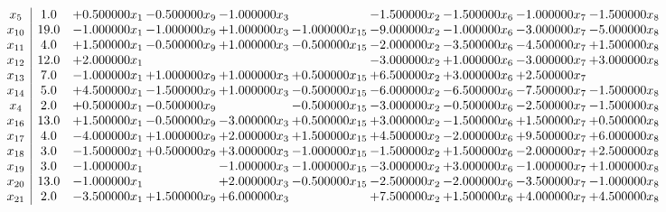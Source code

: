 \documentclass[10pt]{article}
\begin{document}
 \[\begin{array}{c| c c@{\hskip 2pt} c@{\hskip 2pt} c@{\hskip 2pt} c@{\hskip 2pt} c@{\hskip 2pt} c@{\hskip 2pt} c@{\hskip 2pt} c@{\hskip 2pt} }
 x_{5}   &  1.0 & + 0.500000 x_{1} & -0.500000 x_{9} & -1.000000 x_{3} &   & -1.500000 x_{2} & -1.500000 x_{6} & -1.000000 x_{7} & -1.500000 x_{8}\\
 x_{10}   &  19.0 & -1.000000 x_{1} & -1.000000 x_{9} & + 1.000000 x_{3} & -1.000000 x_{15} & -9.000000 x_{2} & -1.000000 x_{6} & -3.000000 x_{7} & -5.000000 x_{8}\\
 x_{11}   &  4.0 & + 1.500000 x_{1} & -0.500000 x_{9} & + 1.000000 x_{3} & -0.500000 x_{15} & -2.000000 x_{2} & -3.500000 x_{6} & -4.500000 x_{7} & + 1.500000 x_{8}\\
 x_{12}   &  12.0 & + 2.000000 x_{1} &    &    &   & -3.000000 x_{2} & + 1.000000 x_{6} & -3.000000 x_{7} & + 3.000000 x_{8}\\
 x_{13}   &  7.0 & -1.000000 x_{1} & + 1.000000 x_{9} & + 1.000000 x_{3} & + 0.500000 x_{15} & + 6.500000 x_{2} & + 3.000000 x_{6} & + 2.500000 x_{7} &   \\
 x_{14}   &  5.0 & + 4.500000 x_{1} & -1.500000 x_{9} & + 1.000000 x_{3} & -0.500000 x_{15} & -6.000000 x_{2} & -6.500000 x_{6} & -7.500000 x_{7} & -1.500000 x_{8}\\
 x_{4}   &  2.0 & + 0.500000 x_{1} & -0.500000 x_{9} &   & -0.500000 x_{15} & -3.000000 x_{2} & -0.500000 x_{6} & -2.500000 x_{7} & -1.500000 x_{8}\\
 x_{16}   &  13.0 & + 1.500000 x_{1} & -0.500000 x_{9} & -3.000000 x_{3} & + 0.500000 x_{15} & + 3.000000 x_{2} & -1.500000 x_{6} & + 1.500000 x_{7} & + 0.500000 x_{8}\\
 x_{17}   &  4.0 & -4.000000 x_{1} & + 1.000000 x_{9} & + 2.000000 x_{3} & + 1.500000 x_{15} & + 4.500000 x_{2} & -2.000000 x_{6} & + 9.500000 x_{7} & + 6.000000 x_{8}\\
 x_{18}   &  3.0 & -1.500000 x_{1} & + 0.500000 x_{9} & + 3.000000 x_{3} & -1.000000 x_{15} & -1.500000 x_{2} & + 1.500000 x_{6} & -2.000000 x_{7} & + 2.500000 x_{8}\\
 x_{19}   &  3.0 & -1.000000 x_{1} &   & -1.000000 x_{3} & -1.000000 x_{15} & -3.000000 x_{2} & + 3.000000 x_{6} & -1.000000 x_{7} & + 1.000000 x_{8}\\
 x_{20}   &  13.0 & -1.000000 x_{1} &   & + 2.000000 x_{3} & -0.500000 x_{15} & -2.500000 x_{2} & -2.000000 x_{6} & -3.500000 x_{7} & -1.000000 x_{8}\\
 x_{21}   &  2.0 & -3.500000 x_{1} & + 1.500000 x_{9} & + 6.000000 x_{3} &   & + 7.500000 x_{2} & + 1.500000 x_{6} & + 4.000000 x_{7} & + 4.500000 x_{8}\\

\end{array}\]
\end{document}
